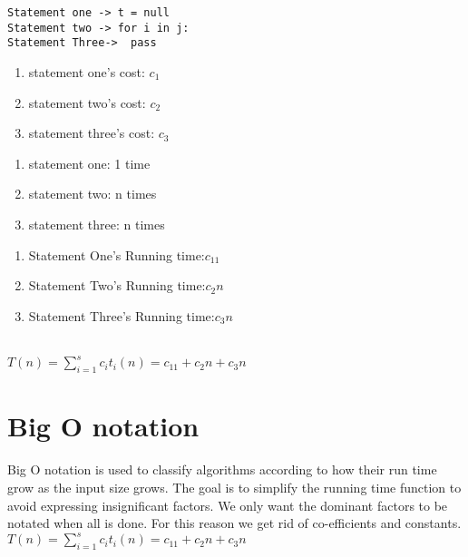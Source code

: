 \documentclass{article}
\begin{document}
\newpage
{}

\begin{verbatim}
Statement one -> t = null 
Statement two -> for i in j:
Statement Three->  pass
\end{verbatim}


\begin{enumerate}
    \item statement one's cost: $c_1$
    \item statement two's cost: $c_2$
    \item statement three's cost: $c_3$
\end{enumerate}


\begin{enumerate}
    \item statement one: 1 time
    \item statement two: n times
    \item statement three: n times
\end{enumerate}


\begin{enumerate}
    \item Statement One's Running time:$c_11$
    \item Statement Two's Running time:$c_2n$
    \item Statement Three's Running time:$c_3n$
\end{enumerate}



\\
$
T(n) = \sum_{i=1}^{s}c_it_i(n)
     = c_11 + c_2n + c_3n
$

\newpage
\section*{Big O notation}
Big O notation is used to classify algorithms according to how their run time grow as the input size grows. The goal is to simplify the running time function to avoid expressing insignificant factors. We only want the dominant factors to be notated when all is done. For this reason we get rid of co-efficients and constants.
\\
$T(n) = \sum_{i=1}^{s}c_it_i(n) = c_11 + c_2n + c_3n$
\end{document}
